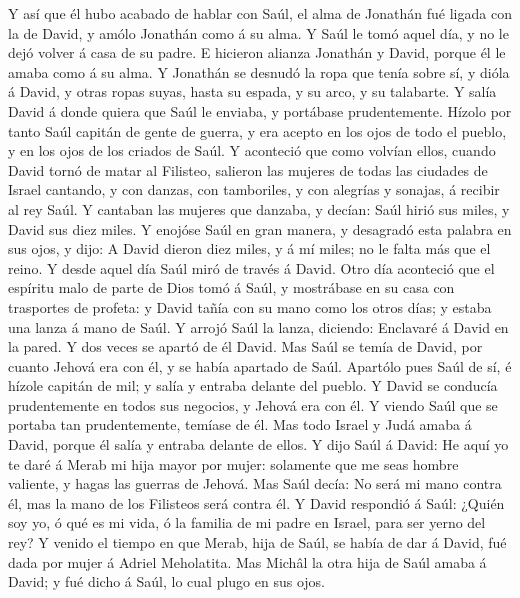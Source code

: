  Y así que él hubo acabado de hablar con Saúl, el alma de
Jonathán fué ligada con la de David, y amólo Jonathán como á su alma.
 Y Saúl le tomó aquel día, y no le dejó volver á casa de su
padre.  E hicieron alianza Jonathán y David, porque él le
amaba como á su alma.  Y Jonathán se desnudó la ropa que
tenía sobre sí, y dióla á David, y otras ropas suyas, hasta su espada, y
su arco, y su talabarte.  Y salía David á donde quiera que
Saúl le enviaba, y portábase prudentemente. Hízolo por tanto Saúl
capitán de gente de guerra, y era acepto en los ojos de todo el pueblo,
y en los ojos de los criados de Saúl.  Y aconteció que como
volvían ellos, cuando David tornó de matar al Filisteo, salieron las
mujeres de todas las ciudades de Israel cantando, y con danzas, con
tamboriles, y con alegrías y sonajas, á recibir al rey Saúl.
 Y cantaban las mujeres que danzaba, y decían: Saúl hirió
sus miles, y David sus diez miles.  Y enojóse Saúl en gran
manera, y desagradó esta palabra en sus ojos, y dijo: A David dieron
diez miles, y á mí miles; no le falta más que el reino.  Y
desde aquel día Saúl miró de través á David.  Otro día
aconteció que el espíritu malo de parte de Dios tomó á Saúl, y
mostrábase en su casa con trasportes de profeta: y David tañía con su
mano como los otros días; y estaba una lanza á mano de Saúl.
 Y arrojó Saúl la lanza, diciendo: Enclavaré á David en la
pared. Y dos veces se apartó de él David.  Mas Saúl se
temía de David, por cuanto Jehová era con él, y se había apartado de
Saúl.  Apartólo pues Saúl de sí, é hízole capitán de mil; y
salía y entraba delante del pueblo.  Y David se conducía
prudentemente en todos sus negocios, y Jehová era con él. 
Y viendo Saúl que se portaba tan prudentemente, temíase de él.
 Mas todo Israel y Judá amaba á David, porque él salía y
entraba delante de ellos.  Y dijo Saúl á David: He aquí yo
te daré á Merab mi hija mayor por mujer: solamente que me seas hombre
valiente, y hagas las guerras de Jehová. Mas Saúl decía: No será mi mano
contra él, mas la mano de los Filisteos será contra él.  Y
David respondió á Saúl: ¿Quién soy yo, ó qué es mi vida, ó la familia de
mi padre en Israel, para ser yerno del rey?  Y venido el
tiempo en que Merab, hija de Saúl, se había de dar á David, fué dada por
mujer á Adriel Meholatita.  Mas Michâl la otra hija de Saúl
amaba á David; y fué dicho á Saúl, lo cual plugo en sus ojos.
